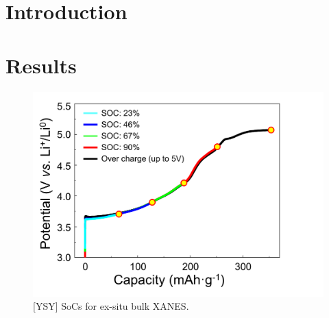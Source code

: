 \documentclass{article}
\begin{document}
\maketitle

\section{Introduction}

\blindtext

\section{Results}

\begin{figure}
  \includegraphics[width=\textwidth]{figures/ys-echem.png}
  \caption{[YSY] SoCs for ex-situ bulk XANES.}
\end{figure}
\end{document}
